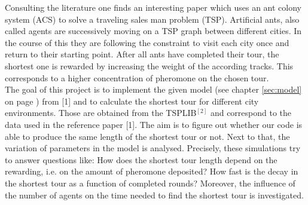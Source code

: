 Consulting the literature \cite{paper} one finds an interesting paper which uses an ant colony system (ACS) to solve a traveling sales man problem (TSP). Artificial ants, also called agents are successively moving on a TSP graph between different cities. In the course of this they are following the constraint to visit each city once and return to their starting point. After all ants have completed their tour, the shortest one is rewarded by increasing the weight of the according tracks. This corresponds to a higher concentration of pheromone on the chosen tour.\\
The goal of this project is to implement the given model (see chapter \ref{sec:model} on page \pageref{sec:model}) from [1] and to calculate the shortest tour for different city environments. Those are obtained from the TSPLIB$^{[2]}$ and correspond to the data used in the reference paper [1]. The aim is to figure out whether our code is able to produce the same length of the shortest tour or not. Next to that, the variation of parameters in the model is analysed. Precisely, these simulations try to answer questions like: How does the shortest tour length depend on the rewarding, i.e. on the amount of pheromone deposited? How fast is the decay in the shortest tour as a function of completed rounds? Moreover, the influence of the number of agents on the time needed to find the shortest tour is investigated.
